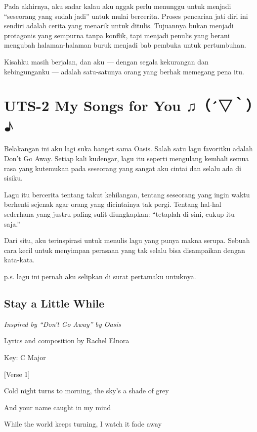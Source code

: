 \documentclass[
  letterpaper,
  DIV=11,
  numbers=noendperiod]{scrreprt}
\begin{document}
Pada akhirnya, aku sadar kalau aku nggak perlu menunggu untuk menjadi
``seseorang yang sudah jadi'' untuk mulai bercerita. Proses pencarian
jati diri ini sendiri adalah cerita yang menarik untuk ditulis.
Tujuannya bukan menjadi protagonis yang sempurna tanpa konflik, tapi
menjadi penulis yang berani mengubah halaman-halaman buruk menjadi bab
pembuka untuk pertumbuhan.

Kisahku masih berjalan, dan aku --- dengan segala kekurangan dan
kebingunganku --- adalah satu-satunya orang yang berhak memegang pena
itu.


\chapter{UTS-2 My Songs for You
♫（´▽｀）♪}\label{uts-2-my-songs-for-you}

Belakangan ini aku lagi suka banget sama Oasis. Salah satu lagu
favoritku adalah Don't Go Away. Setiap kali kudengar, lagu itu seperti
mengulang kembali semua rasa yang kutemukan pada seseorang yang sangat
aku cintai dan selalu ada di sisiku.

Lagu itu bercerita tentang takut kehilangan, tentang seseorang yang
ingin waktu berhenti sejenak agar orang yang dicintainya tak pergi.
Tentang hal-hal sederhana yang justru paling sulit diungkapkan:
``tetaplah di sini, cukup itu saja.''

Dari situ, aku terinspirasi untuk menulis lagu yang punya makna serupa.
Sebuah cara kecil untuk menyimpan perasaan yang tak selalu bisa
disampaikan dengan kata-kata.

p.s. lagu ini pernah aku selipkan di surat pertamaku untuknya.

\section{\texorpdfstring{\textbf{Stay a Little
While}}{Stay a Little While}}\label{stay-a-little-while}

\emph{Inspired by ``Don't Go Away'' by Oasis}

Lyrics and composition by Rachel Elnora

Key: C Major

{[}Verse 1{]}

Cold night turns to morning, the sky's a shade of grey

And your name caught in my mind

While the world keeps turning, I watch it fade away
\end{document}
